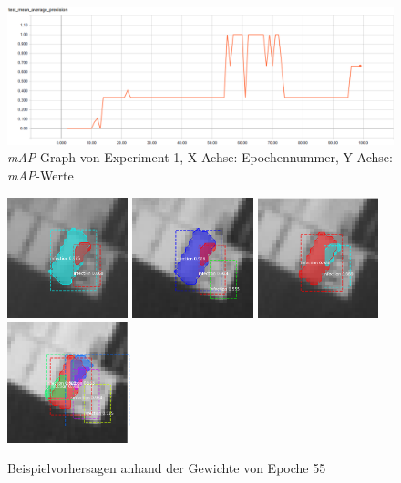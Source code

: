 \begin{figure}[ht]
	\centering
    \includegraphics[width=.7\textwidth]{pics/map-1.PNG}
    \caption[\textit{mAP}-Graph von Experiment 1]{\textit{mAP}-Graph von Experiment 1, X-Achse: Epochennummer, Y-Achse: \textit{mAP}-Werte}
    \label{fig:map-1}
\end{figure}
\begin{figure}[ht]
	\centering
    \includegraphics[height=3.5cm]{pics/pred-1-1.png}
    \includegraphics[height=3.5cm]{pics/pred-1-2.png}
    \includegraphics[height=3.5cm]{pics/pred-1-3.png}
    \includegraphics[height=3.5cm]{pics/pred-1-4.png}
    \caption[Beispielvorhersagen Experiment 1]{Beispielvorhersagen anhand der Gewichte von Epoche 55}
    \label{fig:pred-1}
\end{figure}
